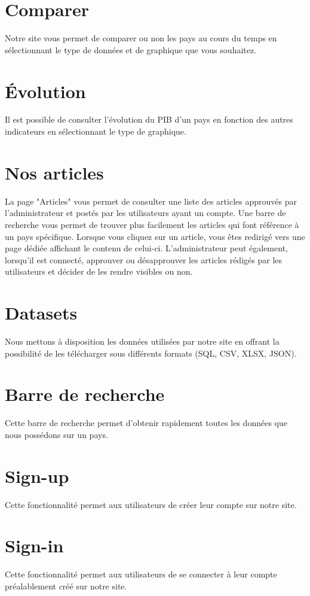 \documentclass[12pt,a4paper]{report}
\begin{document}
\section{Comparer}
Notre site vous permet de comparer ou non les pays au cours du temps en sélectionnant le type de données et de graphique que vous souhaitez.

\section{Évolution}
Il est possible de consulter l'évolution du PIB d'un pays en fonction des autres indicateurs en sélectionnant le type de graphique.

\section{Nos articles}
La page "Articles" vous permet de consulter une liste des articles approuvés par l'administrateur et postés par les utilisateurs ayant un compte. Une barre de recherche vous permet de trouver plus facilement les articles qui font référence à un pays spécifique. Lorsque vous cliquez sur un article, vous êtes redirigé vers une page dédiée affichant le contenu de celui-ci. L'administrateur peut également, lorsqu'il est connecté, approuver ou désapprouver les articles rédigés par les utilisateurs et décider de les rendre visibles ou non.

\section{Datasets}
Nous mettons à disposition les données utilisées par notre site en offrant la possibilité de les télécharger sous différents formats (SQL, CSV, XLSX, JSON).

\section{Barre de recherche}
Cette barre de recherche permet d'obtenir rapidement toutes les données que nous possédons sur un pays.

\section{Sign-up}
Cette fonctionnalité permet aux utilisateurs de créer leur compte sur notre site.

\section{Sign-in}
Cette fonctionnalité permet aux utilisateurs de se connecter à leur compte préalablement créé sur notre site.
\end{document}
